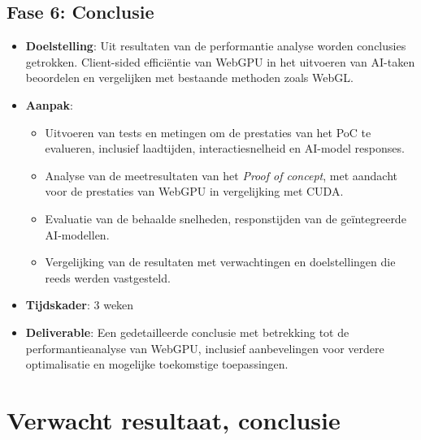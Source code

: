 \subsection*{Fase 6: Conclusie}

\begin{itemize}
  \item \textbf{Doelstelling}: Uit resultaten van de performantie analyse worden conclusies getrokken. Client-sided efficiëntie van WebGPU in het uitvoeren van AI-taken beoordelen en vergelijken met bestaande methoden zoals WebGL.

  \item \textbf{Aanpak}:
  \begin{itemize}
    \item Uitvoeren van tests en metingen om de prestaties van het PoC te evalueren, inclusief laadtijden, interactiesnelheid en AI-model responses.
    \item Analyse van de meetresultaten van het \textit{Proof of concept}, met aandacht voor de prestaties van WebGPU in vergelijking met CUDA.
    \item Evaluatie van de behaalde snelheden, responstijden van de geïntegreerde AI-modellen.
    \item Vergelijking van de resultaten met verwachtingen en doelstellingen die reeds werden vastgesteld.
  \end{itemize}

  \item \textbf{Tijdskader}: 3 weken
  \item \textbf{Deliverable}: Een gedetailleerde conclusie met betrekking tot de performantieanalyse van WebGPU, inclusief aanbevelingen voor verdere optimalisatie en mogelijke toekomstige toepassingen.
\end{itemize}

\section{Verwacht resultaat, conclusie}%
\label{sec:verwachte_resultaten}


